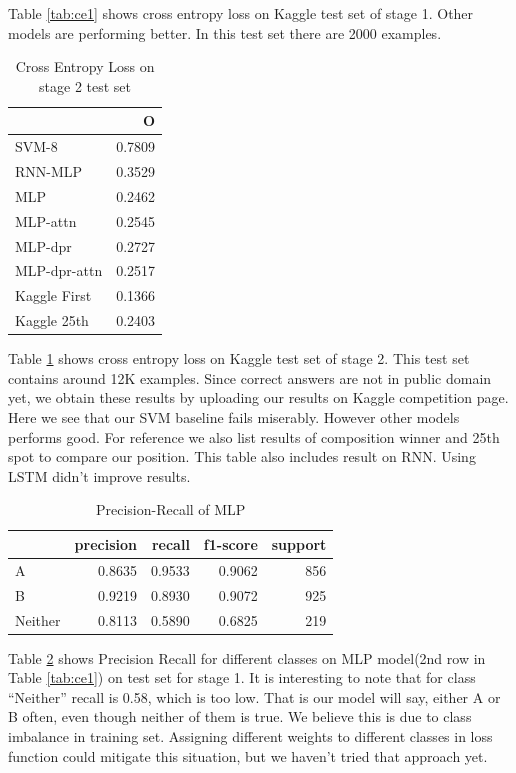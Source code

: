 \documentclass[11pt,a4paper]{article}
\begin{document}
Table \ref{tab:ce1} shows cross entropy loss on Kaggle test set of stage 1.  Other models are performing better. In this test set there are 2000 examples.

\begin{table}
  \centering
  \begin{tabular}{|l|r|}
    \hline
    & O \\
    \hline
    SVM-8          &  0.7809 \\
    \hline
    RNN-MLP & 0.3529 \\
    \hline
    MLP  & 0.2462 \\
    MLP-attn   & 0.2545 \\
    MLP-dpr      & 0.2727 \\
    MLP-dpr-attn & 0.2517 \\
    \hline
    Kaggle First & 0.1366 \\
    Kaggle 25th & 0.2403 \\
    \hline
  \end{tabular}
  \caption{Cross Entropy Loss on stage 2 test set}
  \label{tab:ce2}
\end{table}

Table \ref{tab:ce2} shows cross entropy loss on Kaggle test set of stage 2. This test set contains around 12K examples. Since correct answers are not in public domain yet, we obtain these results by uploading our results on Kaggle competition page. Here we see that our SVM baseline fails miserably. However other models performs good. For reference we also list results of composition winner and 25th spot to compare our position. This table also includes result on RNN. Using LSTM didn't improve results.

\begin{table}
  \centering
  \begin{tabular}{|l|r|r|r|r|}
    \hline
    &    precision&    recall&  f1-score&    support \\
    \hline
    A&     0.8635&    0.9533&    0.9062&       856\\
    B&     0.9219&    0.8930&    0.9072&       925\\
    Neither&     0.8113&    0.5890&    0.6825&       219\\
    \hline

  \end{tabular}
  \caption{Precision-Recall of MLP}
  \label{tab:precisionrecall}
\end{table}

Table \ref{tab:precisionrecall} shows Precision Recall for different classes on MLP model(2nd row in Table \ref{tab:ce1}) on test set for stage 1. It is interesting to note that for class ``Neither'' recall is 0.58, which is too low. That is our model will say, either A or B often, even though neither of them is true. We believe this is due to class imbalance in training set. Assigning different weights to different classes in loss function could mitigate this situation, but we haven't tried that approach yet.
\end{document}
